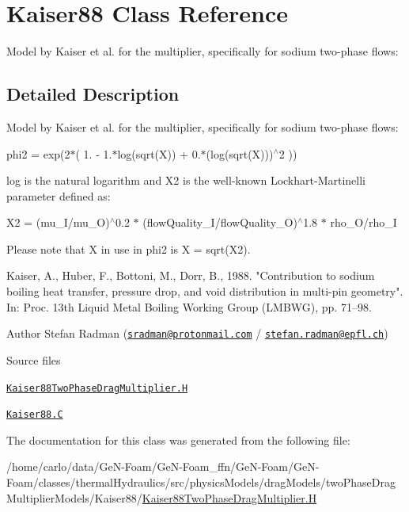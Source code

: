 \hypertarget{classFoam_1_1Kaiser88}{}\section{Kaiser88 Class Reference}
\label{classFoam_1_1Kaiser88}


Model by Kaiser et al. for the multiplier, specifically for sodium two-\/phase flows\+:  




\subsection{Detailed Description}
Model by Kaiser et al. for the multiplier, specifically for sodium two-\/phase flows\+: 

\label{_Description}%
 phi2 = exp(2$\ast$( 1. -\/ 1.$\ast$log(sqrt(\+X)) + 0.$\ast$(log(sqrt(\+X)))$^\wedge$2 ))

log is the natural logarithm and X2 is the well-\/known Lockhart-\/\+Martinelli parameter defined as\+:

X2 = (mu\+\_\+\+I/mu\+\_\+O)$^\wedge$0.2 $\ast$ (flow\+Quality\+\_\+\+I/flow\+Quality\+\_\+O)$^\wedge$1.8 $\ast$ rho\+\_\+\+O/rho\+\_\+I

Please note that X in use in phi2 is X = sqrt(\+X2).

Kaiser, A., Huber, F., Bottoni, M., Dorr, B., 1988. "Contribution to sodium boiling heat transfer, pressure drop, and void distribution in multi-\/pin geometry". In\+: Proc. 13th Liquid Metal Boiling Working Group (L\+M\+B\+WG), pp. 71–98.

Author Stefan Radman (\href{mailto:sradman@protonmail.com}{\tt sradman@protonmail.\+com} / \href{mailto:stefan.radman@epfl.ch}{\tt stefan.\+radman@epfl.\+ch})

\begin{DoxyParagraph}{Source files}

\begin{DoxyItemize}
\item \href{../../../home/carlo/data/GeN-Foam/GeN-Foam_ffn/GeN-Foam/GeN-Foam/classes/thermalHydraulics/src/physicsModels/dragModels/twoPhaseDragMultiplierModels/Kaiser88/Kaiser88TwoPhaseDragMultiplier.H}{\tt Kaiser88\+Two\+Phase\+Drag\+Multiplier.\+H} 
\item \href{../../../home/carlo/data/GeN-Foam/GeN-Foam_ffn/GeN-Foam/GeN-Foam/classes/thermalHydraulics/src/physicsModels/dragModels/twoPhaseDragMultiplierModels/Kaiser88/Kaiser88.C}{\tt Kaiser88.\+C} 
\end{DoxyItemize}
\end{DoxyParagraph}


The documentation for this class was generated from the following file\+:\begin{DoxyCompactItemize}
\item 
/home/carlo/data/\+Ge\+N-\/\+Foam/\+Ge\+N-\/\+Foam\+\_\+ffn/\+Ge\+N-\/\+Foam/\+Ge\+N-\/\+Foam/classes/thermal\+Hydraulics/src/physics\+Models/drag\+Models/two\+Phase\+Drag\+Multiplier\+Models/\+Kaiser88/\hyperlink{Kaiser88TwoPhaseDragMultiplier_8H}{Kaiser88\+Two\+Phase\+Drag\+Multiplier.\+H}\end{DoxyCompactItemize}
